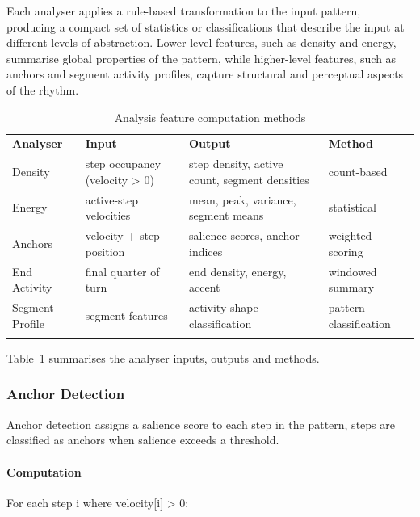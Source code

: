 Each analyser applies a rule-based transformation to the input pattern,
producing a compact set of statistics or classifications that describe
the input at different levels of abstraction. Lower-level features, such
as density and energy, summarise global properties of the pattern, while
higher-level features, such as anchors and segment activity profiles,
capture structural and perceptual aspects of the rhythm.

\begin{longtable}[]{@{}llll@{}}
\caption{Analysis feature computation methods}\label{tab:analysis-feature-computation}\\
\toprule\noalign{}
\textbf{Analyser} & \textbf{Input} & \textbf{Output} &
\textbf{Method} \\
Density & step occupancy (velocity \textgreater{} 0) & step density,
active count, segment densities & count-based \\
Energy & active-step velocities & mean, peak, variance, segment means &
statistical \\
Anchors & velocity + step position & salience scores, anchor indices &
weighted scoring \\
End Activity & final quarter of turn & end density, energy, accent &
windowed summary \\
Segment Profile & segment features & activity shape classification &
pattern classification \\
\midrule\noalign{}
\endhead
\bottomrule\noalign{}
\endlastfoot
\end{longtable}


Table~\ref{tab:analysis-feature-computation} summarises the analyser inputs, outputs and methods.

\subsubsection{Anchor Detection}\label{anchor-detection}

Anchor detection assigns a salience score to each step in the pattern,
steps are classified as anchors when salience exceeds a threshold.

\paragraph{Computation}\label{computation}

For each step i where velocity{[}i{]} \textgreater{} 0:

